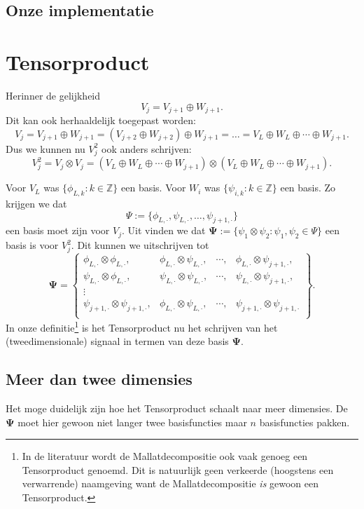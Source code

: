 \documentclass[11pt]{report}
\newcommand{\Z}{\mathbb{Z}}
\theoremstyle{plain}
\theoremstyle{remark}
\begin{document}
\subsection{Onze implementatie}
\section{Tensorproduct}
Herinner de gelijkheid
\[
	V_{j} = V_{j+1} \oplus W_{j+1}.
\]
Dit kan ook herhaaldelijk toegepast worden:
\[
	V_j = V_{j+1} \oplus W_{j+1} = (V_{j+2} \oplus W_{j+2} ) \oplus W_{j+1} = \ldots = V_{L} \oplus W_L \oplus \cdots \oplus W_{j+1}.
\]
Dus we kunnen nu $V_j^2$ ook anders schrijven:
\[
	V_j^2 = V_j \otimes V_j = (V_{L} \oplus W_L \oplus \cdots \oplus W_{j+1}) \otimes (V_{L} \oplus W_L \oplus \cdots \oplus W_{j+1}).
\]

Voor $V_L$ was $\{ \phi_{L,k}: k \in \Z \}$ een basis. Voor $W_i$ was $\{ \psi_{i,k}: k \in \Z \}$ een basis. Zo krijgen we dat
\[
	\Psi := \{ \phi_{L,\cdot}, \psi_{L,\cdot}, \ldots, \psi_{j+1,\cdot} \}
\]
een basis moet zijn voor $V_j$. Uit \cite[T8.5]{tensor_wavelet} vinden we dat $\boldsymbol\Psi := \{ \psi_1 \otimes \psi_2: \psi_1, \psi_2 \in \Psi \}$ een basis is voor $V_j^2$. Dit kunnen we uitschrijven tot
\[
  \boldsymbol\Psi = \left\{
  \begin{array}{cccc}
    \phi_{L, \cdot} \otimes \phi_{L, \cdot}, & \phi_{L, \cdot} \otimes \psi_{L, \cdot}, & \cdots, & \phi_{L, \cdot} \otimes \psi_{j+1,\cdot}, \\
    \psi_{L, \cdot} \otimes \phi_{L, \cdot}, & \psi_{L, \cdot} \otimes \psi_{L, \cdot}, & \cdots, & \psi_{L, \cdot} \otimes \psi_{j+1,\cdot} ,\\
    \vdots \\
    \psi_{j+1, \cdot} \otimes \psi_{j+1, \cdot}, & \phi_{L, \cdot} \otimes \psi_{L, \cdot}, & \cdots, & \psi_{j+1, \cdot} \otimes \psi_{j+1,\cdot} \\
  \end{array}\right\}.
\]
In onze definitie\footnote{In de literatuur wordt de Mallatdecompositie ook vaak genoeg een Tensorproduct genoemd. Dit is natuurlijk geen verkeerde (hoogstens een verwarrende) naamgeving want de Mallatdecompositie \emph{is} gewoon een Tensorproduct.} is het Tensorproduct nu het schrijven van het (tweedimensionale) signaal in termen van deze basis $\boldsymbol\Psi$. 

\subsection{Meer dan twee dimensies}
Het moge duidelijk zijn hoe het Tensorproduct schaalt naar meer dimensies. De $\boldsymbol\Psi$ moet hier gewoon niet langer twee basisfuncties maar $n$ basisfuncties pakken. 
\end{document}
